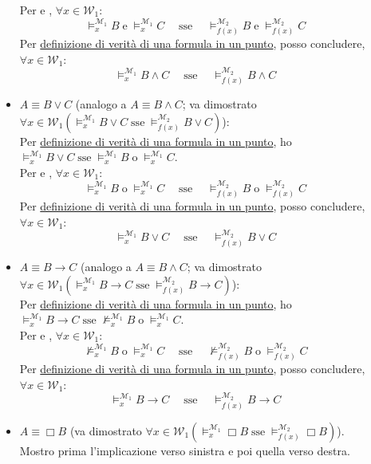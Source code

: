 \documentclass[a4paper,12pt]{article}
\newcommand{\latinmath}[1]{\text{\latinmodern{#1}}} %
\begin{document}
\begin{dimo}
\begin{description}
\begin{itemize}
			Per \latinmath{IH1} e \latinmath{IH2}, $\forall x \in \mathcal{W}_1$:
			$$\vDash_x^{\mathcal{M}_1} B \; \text{e} \; \vDash_x^{\mathcal{M}_1} C \quad \; \text{sse} \quad \; \vDash_{f(x)}^{\mathcal{M}_2} B \; \text{e} \; \vDash_{f(x)}^{\mathcal{M}_2} C$$ 
			Per \hyperlink{defverp}{definizione di verità di una formula in un punto}, posso concludere, $\forall x \in \mathcal{W}_1$:
			$$\vDash_x^{\mathcal{M}_1} B \land C \quad \; \text{sse} \quad \; \vDash_{f(x)}^{\mathcal{M}_2} B \land C$$
			\item $A \equiv B \lor C$ (analogo a $A \equiv B \land C$; va dimostrato \emph{$\forall x \in \mathcal{W}_1 (\vDash_x^{\mathcal{M}_1} B \lor C \; \text{sse} \; \vDash_{f(x)}^{\mathcal{M}_2} B \lor C)$}): \\
			Per \hyperlink{defverp}{definizione di verità di una formula in un punto}, ho $\vDash_x^{\mathcal{M}_1} B \lor C \; \text{sse} \; \vDash_x^{\mathcal{M}_1} B \; \text{o} \; \vDash_x^{\mathcal{M}_1} C$. \\
			Per \latinmath{IH1} e \latinmath{IH2}, $\forall x \in \mathcal{W}_1$:
			$$\vDash_x^{\mathcal{M}_1} B \; \text{o} \; \vDash_x^{\mathcal{M}_1} C \quad \; \text{sse} \quad \; \vDash_{f(x)}^{\mathcal{M}_2} B \; \text{o} \; \vDash_{f(x)}^{\mathcal{M}_2} C$$ 
			Per \hyperlink{defverp}{definizione di verità di una formula in un punto}, posso concludere, $\forall x \in \mathcal{W}_1$:
			$$\vDash_x^{\mathcal{M}_1} B \lor C \quad \; \text{sse} \quad \; \vDash_{f(x)}^{\mathcal{M}_2} B \lor C$$
			\item $A \equiv B \to C$ (analogo a $A \equiv B \land C$; va dimostrato \emph{$\forall x \in \mathcal{W}_1 (\vDash_x^{\mathcal{M}_1} B \to C \; \text{sse} \; \vDash_{f(x)}^{\mathcal{M}_2} B \to C)$}): \\
			Per \hyperlink{defverp}{definizione di verità di una formula in un punto}, ho $\vDash_x^{\mathcal{M}_1} B \to C \; \text{sse} \; \nvDash_x^{\mathcal{M}_1} B \; \text{o} \; \vDash_x^{\mathcal{M}_1} C$. \\
			Per \latinmath{IH1} e \latinmath{IH2}, $\forall x \in \mathcal{W}_1$:
			$$\nvDash_x^{\mathcal{M}_1} B \; \text{o} \; \vDash_x^{\mathcal{M}_1} C \quad \; \text{sse} \quad \; \nvDash_{f(x)}^{\mathcal{M}_2} B \; \text{o} \; \vDash_{f(x)}^{\mathcal{M}_2} C$$ 
			Per \hyperlink{defverp}{definizione di verità di una formula in un punto}, posso concludere, $\forall x \in \mathcal{W}_1$:
			$$\vDash_x^{\mathcal{M}_1} B \to C \quad \; \text{sse} \quad \; \vDash_{f(x)}^{\mathcal{M}_2} B \to C$$
			\item $A \equiv \Box B$ (va dimostrato \emph{$\forall x \in \mathcal{W}_1 (\vDash_x^{\mathcal{M}_1} \Box B \; \text{sse} \; \vDash_{f(x)}^{\mathcal{M}_2} \Box B)$}). Mostro prima l'implicazione verso sinistra e poi quella verso destra. 

\end{itemize}
\end{description}
\end{dimo}
\end{document}
